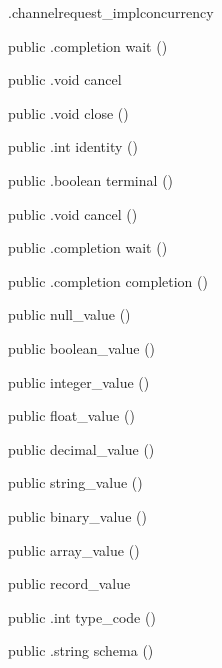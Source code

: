 \begin{CrexxClass}{.channelrequest\_impl}{concurrency}
\begin{Members}
    \Method
      {public}
      {.completion}
      {wait}
      {()}

    \Method
      {public}
      {.void}
      {cancel}
      {}

    \Method
      {public}
      {.void}
      {close}
      {()}

    \Method
      {public}
      {.int}
      {identity}
      {()}

    \Method
      {public}
      {.boolean}
      {terminal}
      {()}

    \Method
      {public}
      {.void}
      {cancel}
      {()}

    \Method
      {public}
      {.completion}
      {wait}
      {()}

    \Method
      {public}
      {.completion}
      {completion}
      {()}

    \Factory
      {public}
      {null\_value}
      {()}

    \Factory
      {public}
      {boolean\_value}
      {()}

    \Factory
      {public}
      {integer\_value}
      {()}

    \Factory
      {public}
      {float\_value}
      {()}

    \Factory
      {public}
      {decimal\_value}
      {()}

    \Factory
      {public}
      {string\_value}
      {()}

    \Factory
      {public}
      {binary\_value}
      {()}

    \Factory
      {public}
      {array\_value}
      {()}

    \Factory
      {public}
      {record\_value}
      {}

    \Method
      {public}
      {.int}
      {type\_code}
      {()}

    \Method
      {public}
      {.string}
      {schema}
      {()}


\end{Members}
\end{CrexxClass}
